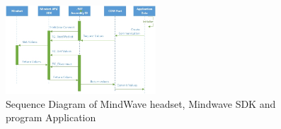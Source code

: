 \documentclass{bioinfo}
\begin{document}
\begin{appendices}
\begin{figure}[ht!]
\includegraphics[width=0.5\textwidth]{Drawing2.jpg}
\caption{Sequence Diagram of MindWave headset, Mindwave SDK and program Application}
\end{figure}


\end{appendices}
\end{document}
